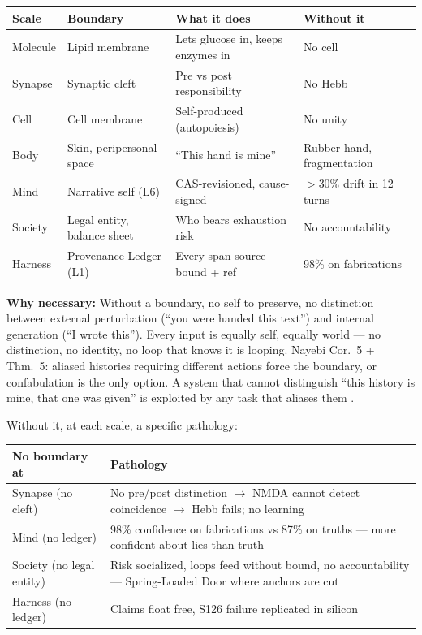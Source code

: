 \documentclass[11pt]{article}
\begin{document}
\begin{center}
\small
\begin{tabular}{p{2.4cm}p{3.2cm}p{5.0cm}p{2.6cm}}
\toprule
Scale & Boundary & What it does & Without it \\
\midrule
Molecule & Lipid membrane & Lets glucose in, keeps enzymes in & No cell \\
Synapse & Synaptic cleft & Pre vs post responsibility & No Hebb \\
Cell & Cell membrane & Self-produced (autopoiesis) & No unity \\
Body & Skin, peripersonal space & ``This hand is mine'' & Rubber-hand, fragmentation \\
Mind & Narrative self (L6) & CAS-revisioned, cause-signed & $>$30\% drift in 12 turns \\
Society & Legal entity, balance sheet & Who bears exhaustion risk & No accountability \\
Harness & Provenance Ledger (L1) & Every span source-bound + ref & 98\% on fabrications \\
\bottomrule
\end{tabular}
\end{center}

\textbf{Why necessary:} Without a boundary, no self to preserve, no distinction between external perturbation (``you were handed this text'') and internal generation (``I wrote this''). Every input is equally self, equally world --- no distinction, no identity, no loop that knows it is looping. Nayebi Cor.~5 + Thm.~5: aliased histories requiring different actions force the boundary, or confabulation is the only option. A system that cannot distinguish ``this history is mine, that one was given'' is exploited by any task that aliases them \citep{nayebi2026}.

Without it, at each scale, a specific pathology:

\begin{center}
\small
\begin{tabular}{p{2.4cm}p{6.0cm}}
\toprule
No boundary at & Pathology \\
\midrule
Synapse (no cleft) & No pre/post distinction $\to$ NMDA cannot detect coincidence $\to$ Hebb fails; no learning \\
Mind (no ledger) & 98\% confidence on fabrications vs 87\% on truths --- more confident about lies than truth \citep{gazzaniga2000,johansson2005} \\
Society (no legal entity) & Risk socialized, loops feed without bound, no accountability --- Spring-Loaded Door where anchors are cut \\
Harness (no ledger) & Claims float free, S126 failure replicated in silicon \\
\bottomrule
\end{tabular}
\end{center}
\end{document}
